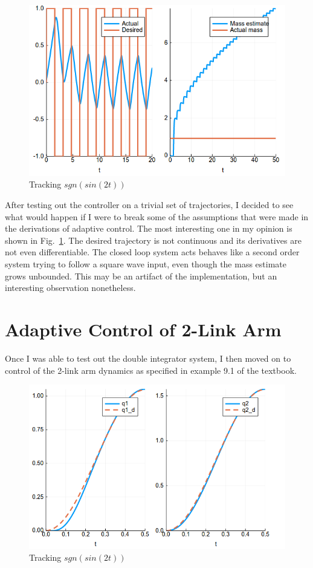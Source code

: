 \documentclass[12pt]{article}
\begin{document}
\begin{figure}[h]
    \centering
    \includegraphics[width=3.5in\textsize]{double_integrator_square_wave.png}
    \caption{Tracking $sgn(sin(2t))$}
    \label{fig:double_integrator_sq}
\end{figure}

\noindent

After testing out the controller on a trivial set of trajectories, I decided to see what would happen if I were to break some of the assumptions that were made in the derivations of adaptive control. The most interesting one in my opinion is shown in Fig.~\ref{fig:double_integrator_sq}. The desired trajectory is not continuous and its derivatives are not even differentiable. The closed loop system acts behaves like a second order system trying to follow a square wave input, even though the mass estimate grows unbounded. This may be an artifact of the implementation, but an interesting observation nonetheless.
\\


\section{Adaptive Control of 2-Link Arm}

Once I was able to test out the double integrator system, I then moved on to control of the 2-link arm dynamics as specified in example 9.1 of the textbook.

\begin{figure}[h]
    \centering
    \includegraphics[width=3.5in\textsize]{arm_trajectory_tracking.png}
    \caption{Tracking $sgn(sin(2t))$}
    \label{fig:arm1}
\end{figure}
\end{document}

